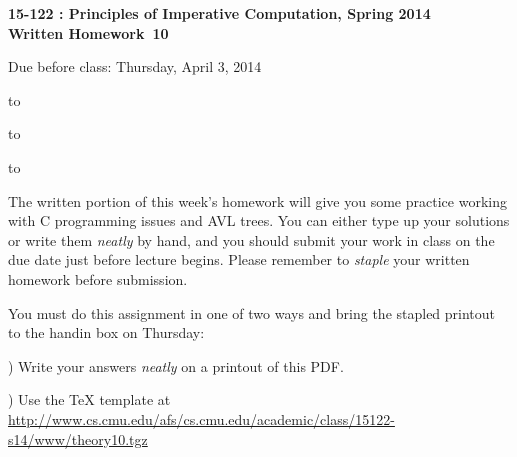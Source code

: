 \documentclass[12pt]{exam}
\newcommand{\hwnumber}{10}
\newcommand{\semester}{Spring 2014}
\begin{document}
\addpoints
\begin{center}
\textbf{\large{15-122 : Principles of Imperative Computation, \semester
\\  \vspace{0.2in} Written Homework~\hwnumber
}}

 \vspace{0.2in}

 \large{Due before class: Thursday, April 3, 2014}
\end{center}

\vspace{0.5in}

\hbox to \textwidth{Name:\enspace\hrulefill}


\vspace{0.2in}

\hbox to \textwidth{Andrew ID:\enspace\hrulefill}

\vspace{0.2in}

\hbox to \textwidth{Recitation:\enspace\hrulefill}


\vspace{0.5in}

\noindent The written portion of this week's homework will give you some
practice working with C programming issues and AVL trees.
You can either type up your solutions or write them
\textit{neatly} by hand, and you should submit your work in class on the
due date just before lecture begins. Please remember to \textit{staple}
your written homework before submission.
\vspace{0.2in}

\begin{center}
\gradetable[v][questions]
\end{center}

\vspace{0.2in}
\begin{center}
  \Large{You must do this assignment in one of two ways and bring the stapled
         printout to the handin box on Thursday:

) Write your answers \textit{neatly} on a printout of this PDF.

) Use the TeX template at
    \url{http://www.cs.cmu.edu/afs/cs.cmu.edu/academic/class/15122-s14/www/theory10.tgz}
 }
\end{center}
\end{document}
